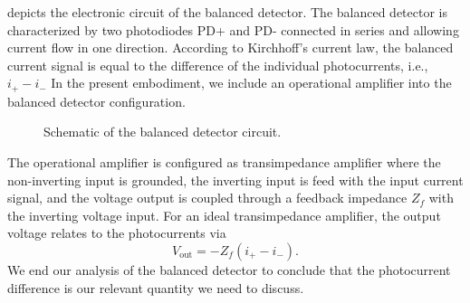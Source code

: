  depicts the electronic circuit of the balanced detector.
The balanced detector is characterized by two photodiodes PD+ and PD- connected in series and allowing current flow in one direction.
According to Kirchhoff's current law, the balanced current signal is equal to the difference of the individual photocurrents, i.e., $i_+-i_-$
In the present embodiment, we include an operational amplifier into the balanced detector configuration.
\begin{figure}[htb]
    \centering
    
    \caption{Schematic of the balanced detector circuit.}\label{fig:balanced_detector_electronics}
\end{figure}
The operational amplifier is configured as transimpedance amplifier where the non-inverting input is grounded, the inverting input is feed with the input current signal, and the voltage output is coupled through a feedback impedance $Z_f$ with the inverting voltage input.
For an ideal transimpedance amplifier, the output voltage relates to the photocurrents via
\begin{equation}
    V_\text{out}
    =-Z_f(i_+-i_-).
\end{equation}
We end our analysis of the balanced detector to conclude that the photocurrent difference is our relevant quantity we need to discuss.

